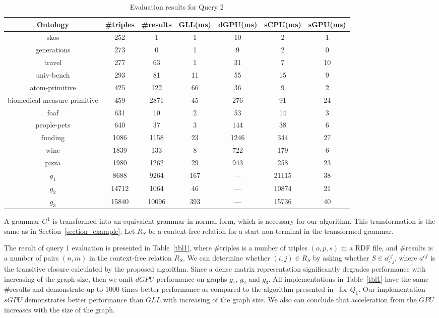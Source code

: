 \begin{table*}[h]
\centering
\caption{Evaluation results for Query 2}
\label{tbl2}

\begin{tabular}{ | c | c | c | c | c | c | c |}
\hline
Ontology & \#triples & \#results & GLL(ms) & dGPU(ms) & sCPU(ms) & sGPU(ms) \\
\hline 
\hline
skos        & 252 & 1 & 1 & 10 & 2 & 1\\
generations & 273 & 0 & 1 & 9 & 2 & 0\\
travel      & 277 & 63 & 1 & 31 & 7 & 10\\
univ-bench  & 293 & 81 & 11 & 55 & 15 & 9\\
atom-primitive & 425 & 122 & 66 & 36 & 9 & 2\\
biomedical-measure-primitive & 459 & 2871 & 45 & 276 & 91 & 24\\
foaf        & 631 & 10 & 2 & 53 & 14 & 3\\
people-pets & 640 & 37 & 3 & 144 & 38 & 6\\
funding     & 1086 & 1158 & 23 & 1246 & 344 & 27\\
wine        & 1839 & 133 & 8 & 722 & 179 & 6\\
pizza       & 1980 & 1262 & 29 & 943 & 258 & 23\\
$g_{1}$     & 8688 & 9264 & 167 & --- & 21115 & 38\\
$g_{2}$     & 14712 & 1064 & 46 & --- & 10874 & 21\\
$g_{3}$     & 15840 & 10096 & 393 & --- & 15736 & 40\\
\hline
\end{tabular}

\end{table*}


A grammar $G^1$ is transformed into an equivalent grammar in normal form, which is necessary for our algorithm. This transformation is the same as in Section~\ref{section_example}. Let $R_S$ be a context-free relation for a start non-terminal in the transformed grammar.

The result of query 1 evaluation is presented in Table~\ref{tbl1}, where \#triples is a number of triples $(o,p,s)$ in a RDF file, and \#results is a number of pairs $(n,m)$ in the context-free relation $R_S$. We can determine whether $(i,j) \in R_S$ by asking whether $S \in a^{cf}_{i,j}$, where $a^{cf}$ is the transitive closure calculated by the proposed algorithm. Since a dense matrix representation significantly degrades performance with increasing of the graph size, then we omit $dGPU$ performance on graphs $g_1$, $g_2$ and $g_3$. All implementations in Table~\ref{tbl1} have the same \#results and demonstrate up to 1000 times better performance as compared to the algorithm presented in~\cite{RDF} for $Q_1$. Our implementation $sGPU$ demonstrates better performance than $GLL$ with increasing of the graph size. We also can conclude that acceleration from the $GPU$ increases with the size of the graph.

